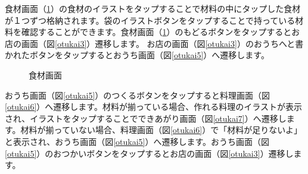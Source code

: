 \documentclass[a4j]{jarticle}
\begin{document}
食材画面（\ref{otukai4}）の食材のイラストをタップすることで材料の中にタップした食材が１つずつ格納されます。袋のイラストボタンをタップすることで持っている材料を確認することができます。食材画面（\ref{otukai4}）のもどるボタンをタップするとお店の画面（図\ref{otukai3}）遷移します。
お店の画面（図\ref{otukai3}）のおうちへと書かれたボタンをタップするとおうち画面（図\ref{otukai5}）へ遷移します。

\begin{figure}[H]
    \begin{center}
    \caption {食材画面}
    \label{otukai4}
    \end{center}
\end{figure}

おうち画面（図\ref{otukai5}）のつくるボタンをタップすると料理画面（図\ref{otukai6}）へ遷移します。材料が揃っている場合、作れる料理のイラストが表示され、イラストをタップすることでできあがり画面（図\ref{otukai7}）へ遷移します。材料が揃っていない場合、料理画面（図\ref{otukai6}）で「材料が足りないよ」と表示され、おうち画面（図\ref{otukai5}）へ遷移します。おうち画面（図\ref{otukai5}）のおつかいボタンをタップするとお店の画面（図\ref{otukai3}）遷移します。\\
\end{document}
